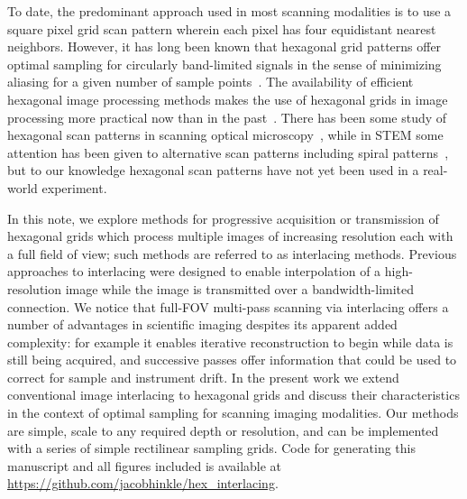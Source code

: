 \documentclass{article}
\begin{document}
To date, the predominant approach used in most scanning modalities is to use a square pixel grid scan pattern wherein each pixel has four equidistant nearest neighbors.
%
However, it has long been known that hexagonal grid patterns offer optimal sampling for circularly band-limited signals in the sense of minimizing aliasing for a given number of sample points~\citep{petersen1962}.
%
The availability of efficient hexagonal image processing methods makes the use
of hexagonal grids in image processing more practical now than in the past~\citep{birdsong2016hexfft,middleton2006hexagonal}.
%
There has been some study of hexagonal scan patterns in scanning optical
microscopy~\citep{heintzmann2007}, while in STEM some attention has been given to alternative scan patterns including spiral patterns~\citep{sang2016dynamic}, but to our knowledge hexagonal scan patterns have not yet been used in a real-world experiment.


In this note, we explore methods for progressive acquisition or transmission of hexagonal grids which process multiple images of increasing resolution each with a full field of view; such methods are referred to as interlacing methods.
%
Previous approaches to interlacing were designed to enable interpolation of a
high-resolution image while the image is transmitted over a bandwidth-limited connection.
%
We notice that full-FOV multi-pass scanning via interlacing offers a number of
advantages in scientific imaging despites its apparent added complexity: for
example it enables iterative reconstruction to begin while data is still being
acquired, and successive passes offer information that could be used to correct
for sample and instrument drift.
%
In the present work we extend conventional image interlacing to hexagonal grids and discuss their characteristics in the context of optimal sampling for scanning imaging modalities.
%
Our methods are simple, scale to any required depth or resolution, and can be
implemented with a series of simple rectilinear sampling grids.
%
Code for generating this manuscript and all figures included is available at
\url{https://github.com/jacobhinkle/hex_interlacing}.


\end{document}
